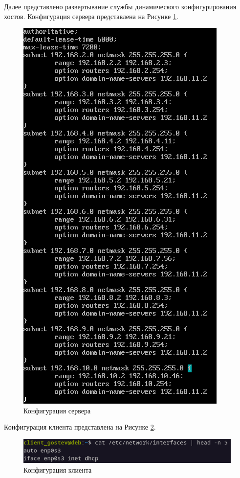 \documentclass[14pt, a4paper]{extarticle}
\numberwithin{equation}{section}
\begin{document}
Далее представлено развертывание службы динамического конфигурирования хостов.
Конфигурация сервера представлена на Рисунке \ref{dhcp_server_cfg}.

\begin{figure}[H]
        \centering
        \includegraphics[scale=0.9]{services/dhcp/servercfg.png}
        \caption{Конфигурация сервера}
        \label{dhcp_server_cfg}
\end{figure}

Конфигурация клиента представлена на Рисунке \ref{dhcp_client_cfg}.

\begin{figure}[H]
        \centering
        \includegraphics[scale=1.2]{services/dhcp/clientcfg.png}
        \caption{Конфигурация клиента}
        \label{dhcp_client_cfg}
\end{figure}
\end{document}
